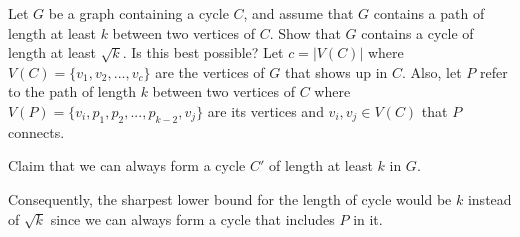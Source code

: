 \begin{hwproblem}{6}{
    Let $G$ be a graph containing a cycle $C$, and assume that $G$
    contains a path of length at least $k$ between two vertices of $C$. Show 
    that $G$ contains a cycle of length at least $\sqrt{k}$. Is this best 
    possible?
  }
  Let \(c = |V(C)|\) where \(V(C) = \{v_1, v_2, ..., v_c\}\) are the 
  vertices of \(G\) that shows up in \(C\). Also, let \(P\) refer to the path of
  length \(k\) between two vertices of \(C\) where \(V(P) = \{v_i, p_1, p_2,
  ..., p_{k-2}, v_j\}\) are its vertices and \(v_i, v_j \in V(C)\) that \(P\)
  connects.

  Claim that we can always form a cycle \(C'\) of length at least \(k\) in 
  \(G\). 

  Consequently, the sharpest lower bound for the length of cycle would be 
  \(k\) instead of \(\sqrt{k}\) since we can always form a cycle that includes
  \(P\) in it.
\end{hwproblem}
